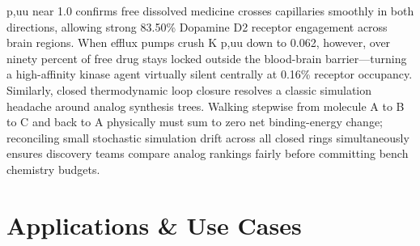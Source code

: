 \documentclass[10pt,letterpaper]{article}
\begin{document}
p,uu near 1.0 confirms free dissolved medicine crosses capillaries smoothly in both directions, allowing strong 83.50\% Dopamine D2 receptor engagement across brain regions. When efflux pumps crush K p,uu down to 0.062, however, over ninety percent of free drug stays locked outside the blood-brain barrier---turning a high-affinity kinase agent virtually silent centrally at 0.16\% receptor occupancy. Similarly, closed thermodynamic loop closure resolves a classic simulation headache around analog synthesis trees. Walking stepwise from molecule A to B to C and back to A physically must sum to zero net binding-energy change; reconciling small stochastic simulation drift across all closed rings simultaneously ensures discovery teams compare analog rankings fairly before committing bench chemistry budgets.

\section{Applications \& Use Cases}
\end{document}
